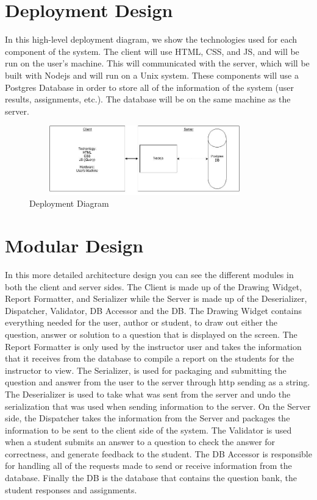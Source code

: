 \chapter{Deployment Design}
      In this high-level deployment diagram, we show the technologies used for each component of the system. The client will use HTML, CSS, and JS, and will be run on the user’s machine. This will communicated with the server, which will be built with Nodejs and will run on a Unix system. These components will use a Postgres Database in order to store all of the information of the system (user results, assignments, etc.). The database will be on the same machine as the server.
                        \begin{figure}[H]
            \centerline{\includegraphics[height=3cm, width=10cm]{Deployment.jpg}}
            \caption{Deployment Diagram}
    \end{figure}
    
\chapter{Modular Design}
In this more detailed architecture design you can see the different modules in both the client and server sides.  The Client is made up of the Drawing Widget, Report Formatter, and Serializer while the Server is made up of the Deserializer, Dispatcher, Validator, DB Accessor and the DB.  The Drawing Widget contains everything needed for the user, author or student, to draw out either the question, answer or solution to a question that is displayed on the screen.  The Report Formatter is only used by the instructor user and takes the information that it receives from the database to compile a report on the students for the instructor to view.  The Serializer, is used for packaging and submitting the question and answer from the user to the server through http sending as a string.  The Deserializer is used to take what was sent from the server and undo the serialization that was used when sending information to the server.  On the Server side, the Dispatcher takes the information from the Server and packages the information to be sent to the client side of the system.  The Validator is used when a student submits an answer to a question to check the answer for correctness, and generate feedback to the student.  The DB Accessor is responsible for handling all of the requests made to send or receive information from the database.  Finally the DB is the database that contains the question bank, the student responses and assignments.    
 
